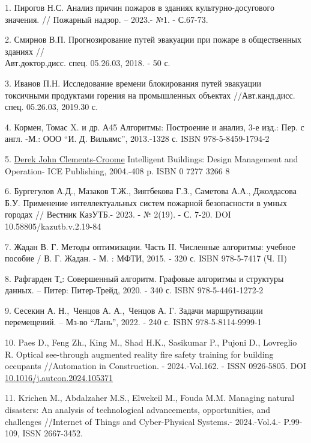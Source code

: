 \begin{references}
1. Пирогов Н.С. Анализ причин пожаров в зданиях культурно-досугового
значения. // Пожарный надзор. -- 2023.- №1. - С.67-73.

2. Смирнов В.П. Прогнозирование путей эвакуации при пожаре в общественных
зданиях // \\Авт.доктор.дисс. спец. 05.26.03, 2018. - 50 с.

3. Иванов П.Н. Исследование времени блокирования путей эвакуации
токсичными продуктами горения на промышленных объектах //Авт.канд.дисс.
спец. 05.26.03, 2019.30 с.

4. Кормен, Томас X. и др. А45 Алгоритмы: Построение и анализ, 3-е изд.:
Пер. с англ. -М.: ООО ``И. Д. Вильямс'', 2013.-1328 с. ISBN
978-5-8459-1794-2

5. \href{https://www.researchgate.net/profile/Derek-Clements-Croome}{Derek
John Clements-Croome} Intelligent Buildings: Design Management and
Operation- ICE Publishing, 2004.-408 p. ISBN 0 7277 3266 8

6. Бургегулов А.Д., Мазаков Т.Ж., Зиятбекова Г.З., Саметова А.А.,
Джолдасова Б.У. Применение интеллектуальных систем пожарной безопасности
в умных городах // Вестник КазУТБ.- 2023. - № 2(19). - С. 7-20. DOI
10.58805/kazutb.v.2.19-84

7. Жадан В. Г. Методы оптимизации. Часть II. Численные алгоритмы:
учебное пособие / В. Г. Жадан. - М. : МФТИ, 2015. - 320 с. ISBN
978-5-7417 (Ч. II)

8. Рафгарден
Т\href{https://www.meloman.kz/other/rafgarden-t-sovershennyj-algoritm-grafovye-algoritmy-i-struktury-dannyh.html?srsltid=AfmBOoonzl3DLF5EZHXaStUKbeOPMt0iOX2nrgpmPI-HIND3-7hOvRYs}{.}:
Совершенный алгоритм. Графовые алгоритмы и структуры данных. -- Питер:
Питер-Трейд, 2020. - 340 с. ISBN 978-5-4461-1272-2

9. Сесекин А. Н.,~Ченцов А. А.,~Ченцов А. Г. Задачи маршрутизации
перемещений. -- Мз-во ``Лань'', 2022. - 240 с. ISBN 978-5-8114-9999-1

10. Paes D., Feng Zh., King M., Shad H.K., Sasikumar P., Pujoni D.,
Lovreglio R. Optical see-through augmented reality fire safety training
for building occupants //Automation in Construction. - 2024.-Vol.162. -
ISSN 0926-5805. DOI
\href{https://doi.org/10.1016/j.autcon.2024.105371}{10.1016/j.autcon.2024.105371}

11. Krichen M., Abdalzaher M.S., Elwekeil M., Fouda M.M. Managing
natural disasters: An analysis of technological advancements,
opportunities, and challenges //Internet of Things and Cyber-Physical
Systems.- 2024.-Vol.4.- P.99-109, ISSN 2667-3452.


\end{references}
